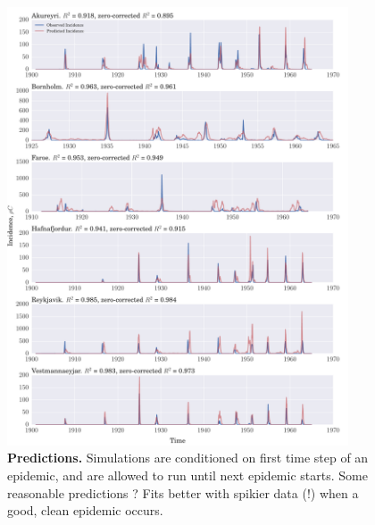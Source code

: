 \documentclass[10pt]{article}
\begin{document}
\begin{figure}[H]
\label{fig_predictions}
\caption{\textbf{Predictions.} Simulations are conditioned on first time step of an epidemic, and are allowed to run until next epidemic starts. Some reasonable predictions ? Fits better with spikier data (!) when a good, clean epidemic occurs.}
\centering
\includegraphics[width=0.9\textwidth]{figures/2_predictions.pdf}
\end{figure}
\end{document}
